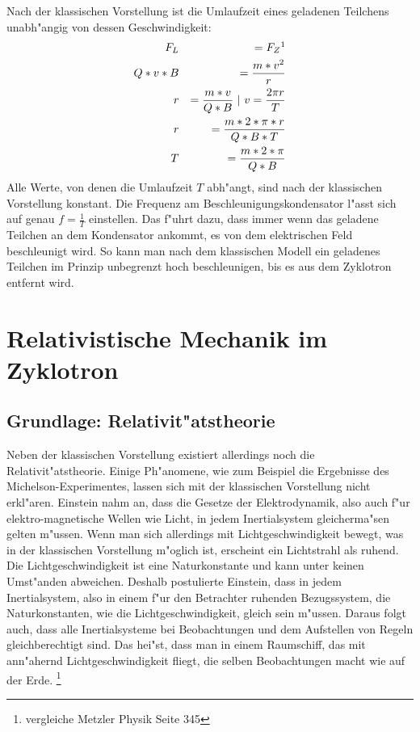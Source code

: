 \documentclass[14pt, a4paper]{report}
\begin{document}
Nach der klassischen Vorstellung ist die Umlaufzeit eines geladenen Teilchens 
unabh"angig von dessen Geschwindigkeit:
\begin{eqnarray}
  F_L  		&& = F_Z  \footnotemark  \\
  Q * v * B 	&& = \frac{m * v^2}{r} \label{Radius im Zyklotron}\\
  r		&& = \frac{m * v}{Q * B}  ~ | ~ v = \frac{2\pi r}{T} \\
  r		&& = \frac{m * 2 * \pi * r}{Q * B * T} \\
  T		&& = \frac{m * 2 * \pi }{Q * B} \label{klassische_Umlaufzeit}
\end{eqnarray}
Alle Werte, von denen die Umlaufzeit $T$ abh"angt, 
sind nach der klassischen Vorstellung konstant. 
Die Frequenz am Beschleunigungskondensator l"asst sich auf genau $f = \frac{1}{T}$
einstellen. Das f"uhrt dazu, dass immer wenn das geladene Teilchen an dem Kondensator 
ankommt, es von dem elektrischen Feld beschleunigt wird. So kann man nach dem klassischen Modell
ein geladenes Teilchen im Prinzip unbegrenzt hoch beschleunigen, bis es aus dem
Zyklotron entfernt wird. \label{klassische_Erwartung}

\chapter{Relativistische Mechanik im Zyklotron}
\section{Grundlage: Relativit"atstheorie}
Neben der klassischen Vorstellung existiert allerdings noch die 
Relativit"atstheorie. Einige Ph"anomene, wie zum Beispiel die Ergebnisse 
des Michelson-Experimentes,
lassen sich mit der klassischen Vorstellung nicht erkl"aren. Einstein nahm an, dass 
die Gesetze der Elektrodynamik, also auch f"ur elektro-magnetische Wellen wie Licht,
in jedem Inertialsystem gleicherma"sen gelten m"ussen. 
Wenn man sich allerdings mit Lichtgeschwindigkeit bewegt, was in der klassischen Vorstellung 
m"oglich ist, erscheint ein Lichtstrahl als ruhend. 
Die Lichtgeschwindigkeit ist eine Naturkonstante und kann unter keinen 
Umst"anden abweichen. Deshalb postulierte Einstein, dass in jedem Inertialsystem, also in
einem f"ur den Betrachter ruhenden Bezugssystem, die 
Naturkonstanten, wie die Lichtgeschwindigkeit, gleich sein m"ussen. Daraus folgt auch,
dass alle Inertialsysteme bei Beobachtungen und dem Aufstellen von Regeln gleichberechtigt sind. 
Das hei"st, dass man in einem Raumschiff, das mit ann"ahernd Lichtgeschwindigkeit
fliegt, die selben Beobachtungen macht wie auf der Erde.
\footnote{vergleiche Metzler Physik Seite 345}
\end{document}
